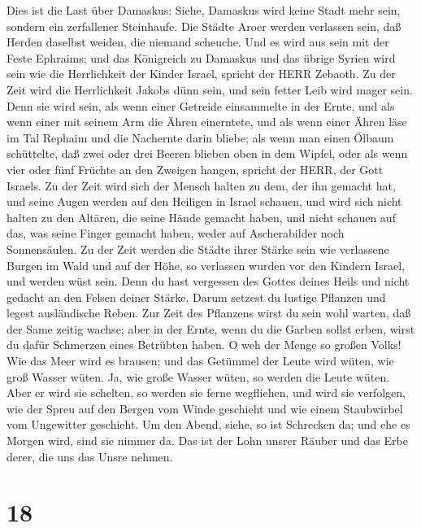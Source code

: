  Dies ist die Last über Damaskus: Siehe, Damaskus wird keine
Stadt mehr sein, sondern ein zerfallener Steinhaufe.  Die
Städte Aroer werden verlassen sein, daß Herden daselbst weiden, die
niemand scheuche.  Und es wird aus sein mit der Feste
Ephraims; und das Königreich zu Damaskus und das übrige Syrien wird sein
wie die Herrlichkeit der Kinder Israel, spricht der HERR Zebaoth.
 Zu der Zeit wird die Herrlichkeit Jakobs dünn sein, und
sein fetter Leib wird mager sein.  Denn sie wird sein, als
wenn einer Getreide einsammelte in der Ernte, und als wenn einer mit
seinem Arm die Ähren einerntete, und als wenn einer Ähren läse im Tal
Rephaim  und die Nachernte darin bliebe; als wenn man einen
Ölbaum schüttelte, daß zwei oder drei Beeren blieben oben in dem Wipfel,
oder als wenn vier oder fünf Früchte an den Zweigen hangen, spricht der
HERR, der Gott Israels.  Zu der Zeit wird sich der Mensch
halten zu dem, der ihn gemacht hat, und seine Augen werden auf den
Heiligen in Israel schauen,  und wird sich nicht halten zu
den Altären, die seine Hände gemacht haben, und nicht schauen auf das,
was seine Finger gemacht haben, weder auf Ascherabilder noch
Sonnensäulen.  Zu der Zeit werden die Städte ihrer Stärke
sein wie verlassene Burgen im Wald und auf der Höhe, so verlassen wurden
vor den Kindern Israel, und werden wüst sein.  Denn du hast
vergessen des Gottes deines Heils und nicht gedacht an den Felsen deiner
Stärke. Darum setzest du lustige Pflanzen und legest ausländische Reben.
 Zur Zeit des Pflanzens wirst du sein wohl warten, daß der
Same zeitig wachse; aber in der Ernte, wenn du die Garben sollst erben,
wirst du dafür Schmerzen eines Betrübten haben.  O weh der
Menge so großen Volks! Wie das Meer wird es brausen; und das Getümmel
der Leute wird wüten, wie groß Wasser wüten.  Ja, wie große
Wasser wüten, so werden die Leute wüten. Aber er wird sie schelten, so
werden sie ferne wegfliehen, und wird sie verfolgen, wie der Spreu auf
den Bergen vom Winde geschieht und wie einem Staubwirbel vom Ungewitter
geschieht.  Um den Abend, siehe, so ist Schrecken da; und
ehe es Morgen wird, sind sie nimmer da. Das ist der Lohn unsrer Räuber
und das Erbe derer, die uns das Unsre nehmen.

\hypertarget{section-17}{%
\section{18}\label{section-17}}


